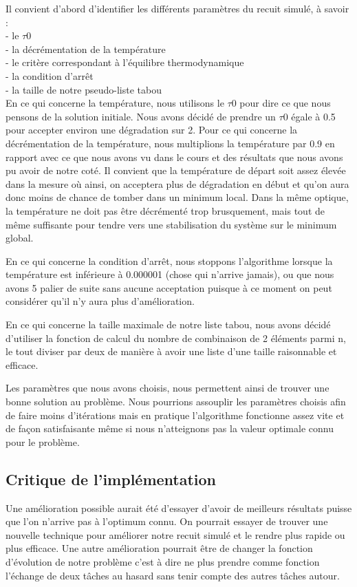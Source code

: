 \documentclass{report}
\begin{document}
Il convient d'abord d'identifier les différents paramètres du recuit simulé, à savoir :\\
- le $\tau 0$\\
- la décrémentation de la température\\
- le critère correspondant à l'équilibre thermodynamique\\
- la condition d'arrêt\\
- la taille de notre pseudo-liste tabou\\

En ce qui concerne la température, nous utilisons le $\tau 0$ pour dire ce que nous pensons de la solution initiale. Nous avons décidé de prendre un $\tau 0$ égale à 0.5 pour accepter environ une dégradation sur 2. Pour ce qui concerne la décrémentation de la température, nous multiplions la température par 0.9 en rapport avec ce que nous avons vu dans le cours et des résultats que nous avons pu avoir de notre coté. Il convient que la température de départ soit assez élevée dans la mesure où ainsi, on acceptera plus de dégradation en début et qu'on aura donc moins de chance de tomber dans un minimum local. Dans la même optique, la température ne doit pas être décrémenté trop brusquement, mais tout de même suffisante pour tendre vers une stabilisation du système sur le minimum global.

En ce qui concerne la condition d'arrêt, nous stoppons l'algorithme lorsque la température est inférieure à 0.000001 (chose qui n'arrive jamais), ou que nous avons 5 palier de suite sans aucune acceptation puisque à ce moment on peut considérer qu'il n'y aura plus d'amélioration.

En ce qui concerne la taille maximale de notre liste tabou, nous avons décidé d'utiliser la fonction de calcul du nombre de combinaison de 2 éléments parmi n, le tout diviser par deux de manière à avoir une liste d'une taille raisonnable et efficace.

Les paramètres que nous avons choisis, nous permettent ainsi de trouver une bonne solution au problème. Nous pourrions assouplir les paramètres choisis afin de faire moins d'itérations mais en pratique l'algorithme fonctionne assez vite et de façon satisfaisante même si nous n'atteignons pas la valeur optimale connu pour le problème.

\subsection{Critique de l'implémentation}
Une amélioration possible aurait été d'essayer d'avoir de meilleurs résultats puisse que l'on n'arrive pas à l'optimum connu. On pourrait essayer de trouver une nouvelle technique pour améliorer notre recuit simulé et le rendre plus rapide ou plus efficace. Une autre amélioration pourrait être de changer la fonction d'évolution de notre problème c'est à dire ne plus prendre comme fonction l'échange de deux tâches au hasard sans tenir compte des autres tâches autour.
\end{document}
